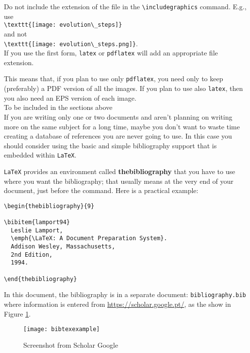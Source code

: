 Do not include the extension of the file in the \verb!\includegraphics! command. E.g., use\\
\verb!\texttt{[image: evolution\_steps]}!\\
and not\\
\verb!\texttt{[image: evolution\_steps.png]}!.\\
If you use the first form, \verb!latex! or \verb!pdflatex! will add an appropriate file extension.

This means that, if you plan to use only \verb!pdflatex!, you need only to keep (preferably) a PDF version of all the images. If you plan to use also \verb!latex!, then you also need an EPS version of each image.\\


{\Large To be included in the sections above} \\

If you are writing only one or two documents and aren't planning on writing more on the same subject for a long time, maybe you don't want to waste time creating a database of references you are never going to use. In this case you should consider using the basic and simple bibliography support that is embedded within \texttt{LaTeX}.

\texttt{LaTeX} provides an environment called \textbf{thebibliography} that you have to use where you want the bibliography; that usually means at the very end of your document, just before the \verb!! command. Here is a practical example:

\begin{verbatim}
\begin{thebibliography}{9}

\bibitem{lamport94}
  Leslie Lamport,
  \emph{\LaTeX: A Document Preparation System}.
  Addison Wesley, Massachusetts,
  2nd Edition,
  1994.

\end{thebibliography}
\end{verbatim}

In this document, the bibliography is in a separate document: \texttt{bi\-blio\-gra\-phy.bib}  where information is entered from \url{https://scholar.google.pt/}, as the show in Figure \ref{fig:bibtex}.

\begin{figure}[ht]
	\centering
	\texttt{[image: bibtexexample]}
	  \caption{Screenshot from Scholar Google}
  \label{fig:bibtex}
\end{figure}


